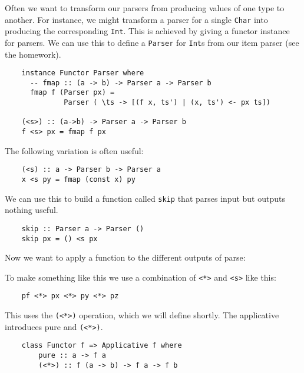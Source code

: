 \documentclass[a4paper,12pt]{article}
\theoremstyle{remark}
\begin{document}
Often we want to transform our parsers from producing values of one type to
another. For instance, we might transform a parser for a single \lstinline{Char} into producing
the corresponding \lstinline{Int}. This is achieved by giving a functor instance for parsers.
We can use this to define a \lstinline{Parser} for \lstinline{Int}s from our item parser (see the homework).


\begin{lstlisting}
    instance Functor Parser where
      -- fmap :: (a -> b) -> Parser a -> Parser b
      fmap f (Parser px) =
              Parser ( \ts -> [(f x, ts') | (x, ts') <- px ts])

    (<s>) :: (a->b) -> Parser a -> Parser b
    f <s> px = fmap f px  \end{lstlisting}

The following variation is often useful:

\begin{lstlisting}
    (<s) :: a -> Parser b -> Parser a
    x <s py = fmap (const x) py  \end{lstlisting}

We can use this to build a function called \lstinline{skip} that parses input but outputs
nothing useful.

\begin{lstlisting}
    skip :: Parser a -> Parser ()
    skip px = () <s px  \end{lstlisting}

Now we want to apply a function to the different outputs of parse:

\begin{figure}[H]
  \centering
\end{figure}


To make something like this we use a combination of \lstinline{<*>} and \lstinline{<s>} like this:

\begin{lstlisting}
    pf <*> px <*> py <*> pz  \end{lstlisting}

This uses the \lstinline{(<*>)} operation, which we will define shortly. The applicative
introduces pure and \lstinline{(<*>)}.

\begin{lstlisting}
    class Functor f => Applicative f where
        pure :: a -> f a
        (<*>) :: f (a -> b) -> f a -> f b  \end{lstlisting}
\end{document}
